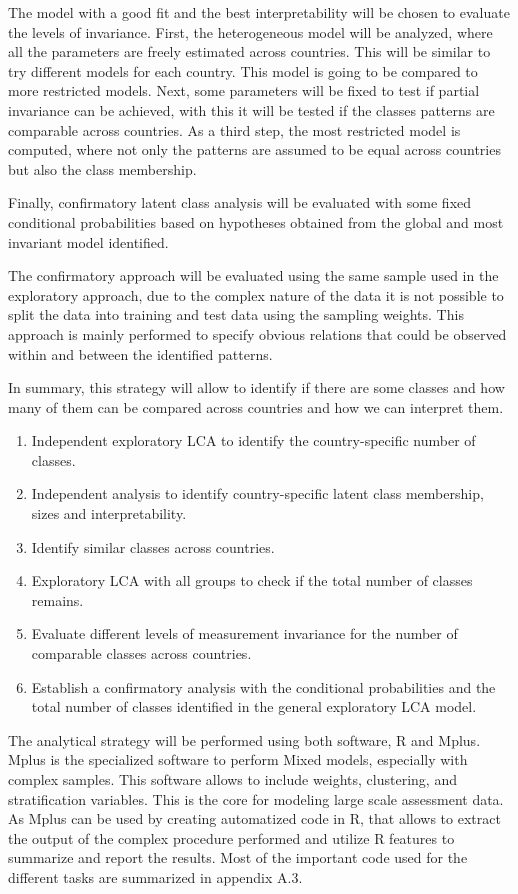 \documentclass[12pt,a4paper,oneside]{reedthesis}
\providecommand{\tightlist}{%
  \setlength{\itemsep}{0pt}\setlength{\parskip}{0pt}}
\begin{document}
The model with a good fit and the best interpretability will be chosen to evaluate the levels of invariance. First, the heterogeneous model will be analyzed, where all the parameters are freely estimated across countries. This will be similar to try different models for each country. This model is going to be compared to more restricted models. Next, some parameters will be fixed to test if partial invariance can be achieved, with this it will be tested if the classes patterns are comparable across countries. As a third step, the most restricted model is computed, where not only the patterns are assumed to be equal across countries but also the class membership.

Finally, confirmatory latent class analysis will be evaluated with some fixed conditional probabilities based on hypotheses obtained from the global and most invariant model identified.

The confirmatory approach will be evaluated using the same sample used in the exploratory approach, due to the complex nature of the data it is not possible to split the data into training and test data using the sampling weights. This approach is mainly performed to specify obvious relations that could be observed within and between the identified patterns.

In summary, this strategy will allow to identify if there are some classes and how many of them can be compared across countries and how we can interpret them.
\begin{enumerate}
\def\labelenumi{\arabic{enumi}.}
\tightlist
\item
  Independent exploratory LCA to identify the country-specific number of classes.
\item
  Independent analysis to identify country-specific latent class membership, sizes and interpretability.
\item
  Identify similar classes across countries.
\item
  Exploratory LCA with all groups to check if the total number of classes remains.
\item
  Evaluate different levels of measurement invariance for the number of comparable classes across countries.
\item
  Establish a confirmatory analysis with the conditional probabilities and the total number of classes identified in the general exploratory LCA model.
\end{enumerate}
The analytical strategy will be performed using both software, R and Mplus. Mplus is the specialized software to perform Mixed models, especially with complex samples. This software allows to include weights, clustering, and stratification variables. This is the core for modeling large scale assessment data. As Mplus can be used by creating automatized code in R, that allows to extract the output of the complex procedure performed and utilize R features to summarize and report the results. Most of the important code used for the different tasks are summarized in appendix A.3.
\end{document}
